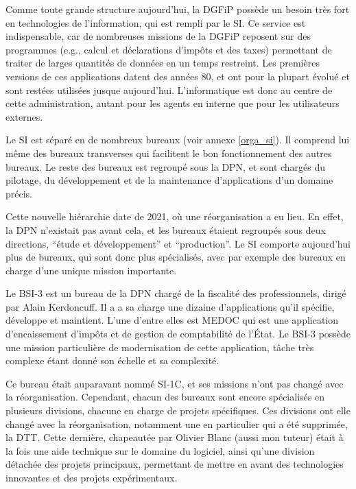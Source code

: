\documentclass[openany, 12pt]{memoir}
\begin{document}
\bigskip

Comme toute grande structure aujourd'hui, la \gls{DGFiP} possède un besoin très fort en technologies de l'information, qui est rempli par le \gls{SI}. Ce service est indispensable, car de nombreuses missions de la DGFiP reposent sur des programmes (e.g., calcul et déclarations d'impôts et des taxes) permettant de traiter de larges quantités de données en un temps restreint. Les premières versions de ces applications datent des années 80, et ont pour la plupart évolué et sont restées utilisées jusque aujourd'hui. L'informatique est donc au centre de cette administration, autant pour les agents en interne que pour les utilisateurs externes.

Le \gls{SI} est séparé en de nombreux bureaux (voir annexe \ref{orga_si}). Il comprend lui même des bureaux \glspl{transverse} qui facilitent le bon fonctionnement des autres bureaux. Le reste des bureaux est regroupé sous la \gls{DPN}, et sont chargés du pilotage, du développement et de la maintenance d'applications d'un domaine précis.

Cette nouvelle hiérarchie date de 2021, où une réorganisation a eu lieu. En effet, la \gls{DPN} n'existait pas avant cela, et les bureaux étaient regroupés sous deux directions, ``étude et développement'' et ``production''. Le \gls{SI} comporte aujourd'hui plus de bureaux, qui sont donc plus spécialisés, avec par exemple des bureaux en charge d'une unique mission importante.

\bigskip

Le \gls{BSI-3} est un bureau de la \gls{DPN} chargé de la fiscalité des professionnels, dirigé par Alain Kerdoncuff. Il a a sa charge une dizaine d'applications qu'il spécifie, développe et maintient. L'une d'entre elles est \gls{MEDOC} qui est une application d'encaissement d'impôts et de gestion de comptabilité de l'État. Le \gls{BSI-3} possède une mission particulière de modernisation de cette application, tâche très complexe étant donné son échelle et sa complexité.

Ce bureau était auparavant nommé SI-1C, et ses missions n'ont pas changé avec la réorganisation. Cependant, chacun des bureaux sont encore spécialisés en plusieurs divisions, chacune en charge de projets spécifiques. Ces divisions ont elle changé avec la réorganisation, notamment une en particulier qui a été supprimée, la \gls{DTT}. Cette dernière, chapeautée par Olivier Blanc (aussi mon tuteur) était à la fois une aide technique sur le domaine du logiciel, ainsi qu'une division détachée des projets principaux, permettant de mettre en avant des technologies innovantes et des projets expérimentaux.
\end{document}
